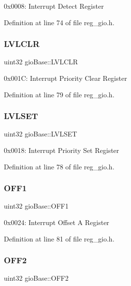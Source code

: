 0x0008\+: Interrupt Detect Register 

Definition at line 74 of file reg\+\_\+gio.\+h.

\mbox{\label{structgioBase_afe5f6f4391825df2c539c9acfe9bbfd8}} 
\subsubsection{\texorpdfstring{L\+V\+L\+C\+LR}{LVLCLR}}
{\footnotesize\ttfamily uint32 gio\+Base\+::\+L\+V\+L\+C\+LR}

0x001C\+: Interrupt Priority Clear Register 

Definition at line 79 of file reg\+\_\+gio.\+h.

\mbox{\label{structgioBase_a2de2bac0e893f429a1759f353a94ea31}} 
\subsubsection{\texorpdfstring{L\+V\+L\+S\+ET}{LVLSET}}
{\footnotesize\ttfamily uint32 gio\+Base\+::\+L\+V\+L\+S\+ET}

0x0018\+: Interrupt Priority Set Register 

Definition at line 78 of file reg\+\_\+gio.\+h.

\mbox{\label{structgioBase_a30acfa6dfeabc36a749a41f7143ba6ce}} 
\subsubsection{\texorpdfstring{O\+F\+F1}{OFF1}}
{\footnotesize\ttfamily uint32 gio\+Base\+::\+O\+F\+F1}

0x0024\+: Interrupt Offset A Register 

Definition at line 81 of file reg\+\_\+gio.\+h.

\mbox{\label{structgioBase_a9a26c57caea956a4c9bf1d0a3977c535}} 
\subsubsection{\texorpdfstring{O\+F\+F2}{OFF2}}
{\footnotesize\ttfamily uint32 gio\+Base\+::\+O\+F\+F2}

